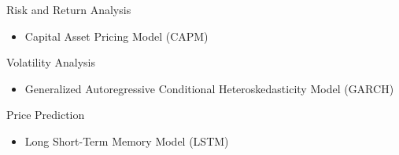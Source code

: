 Risk and Return Analysis

\begin{itemize}
    \item Capital Asset Pricing Model  (CAPM)
\end{itemize}

Volatility Analysis

\begin{itemize}
    \item Generalized Autoregressive Conditional Heteroskedasticity Model (GARCH) 
\end{itemize}

Price Prediction

\begin{itemize}
    \item Long Short-Term Memory Model (LSTM)
\end{itemize}